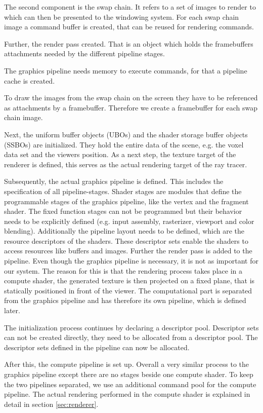 \documentclass[12pt,conference]{IEEEtran}
\begin{document}
The second component is the swap chain. It refers to a set of images to render to which can then be presented to the windowing system. For each swap chain image a command buffer is created, that can be reused for rendering commands.

Further, the render pass created. That is an object which holds the framebuffers attachments needed by the different pipeline stages.

The graphics pipeline needs memory to execute commands, for that a pipeline cache is created.

To draw the images from the swap chain on the screen they have to be referenced as attachments by a framebuffer. Therefore we create a framebuffer for each swap chain image.

Next, the uniform buffer objects (UBOs) and the shader storage buffer objects (SSBOs) are initialized. They hold the entire data of the scene, e.g. the voxel data set and the viewers position. As a next step, the texture target of the renderer is defined, this serves as the actual rendering target of the ray tracer.
\par
Subsequently, the actual graphics pipeline is defined. This includes the specification of all pipeline-stages. Shader stages are modules that define the programmable stages of the graphics pipeline, like the vertex and the fragment shader. The fixed function stages can not be programmed but their behavior needs to be explicitly defined (e.g. input assembly, rasterizer, viewport and color blending). Additionally the pipeline layout needs to be defined, which are the resource descriptors of the shaders. These descriptor sets enable the shaders to access resources like buffers and images. Further the render pass is added to the pipeline. 
Even though the graphics pipeline is necessary, it is not as important for our system. The reason for this is that the rendering process takes place in a compute shader, the generated texture is then projected on a fixed plane, that is statically positioned in front of the viewer. The computational part is separated from the graphics pipeline and has therefore its own pipeline, which is defined later.
\par
The initialization process continues by declaring a descriptor pool. Descriptor sets can not be created directly, they need to be allocated from a descriptor pool. The descriptor sets defined in the pipeline can now be allocated.
\par
After this, the compute pipeline is set up. Overall a very similar process to the graphics pipeline except there are no stages beside one compute shader. To keep the two pipelines separated, we use an additional command pool for the compute pipeline. The actual rendering performed in the compute shader is explained in detail in section \ref{sec:renderer}. 
\end{document}
